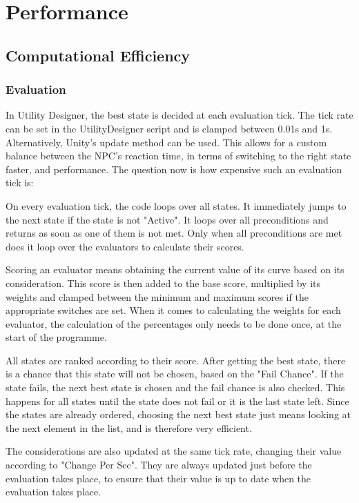 \chapter{Performance}
\label{chap:performance}
\section{Computational Efficiency}
\label{sec:performance_computationalefficiency}

\subsection{Evaluation}
\label{sec:performance_computationalefficiency_evaluation}

In Utility Designer, the best state is decided at each evaluation tick. The tick rate can be set in the UtilityDesigner script and is clamped between 0.01s and 1s. Alternatively, Unity's update method can be used. This allows for a custom balance between the NPC's reaction time, in terms of switching to the right state faster, and performance. The question now is how expensive such an evaluation tick is:

On every evaluation tick, the code loops over all states. It immediately jumps to the next state if the state is not "Active". It loops over all preconditions and returns as soon as one of them is not met. Only when all preconditions are met does it loop over the evaluators to calculate their scores.

Scoring an evaluator means obtaining the current value of its curve based on its consideration. This score is then added to the base score, multiplied by its weights and clamped between the minimum and maximum scores if the appropriate switches are set. When it comes to calculating the weights for each evaluator, the calculation of the percentages only needs to be done once, at the start of the programme.

All states are ranked according to their score. After getting the best state, there is a chance that this state will not be chosen, based on the "Fail Chance". If the state fails, the next best state is chosen and the fail chance is also checked. This happens for all states until the state does not fail or it is the last state left. Since the states are already ordered, choosing the next best state just means looking at the next element in the list, and is therefore very efficient.

The considerations are also updated at the same tick rate, changing their value according to "Change Per Sec". They are always updated just before the evaluation takes place, to ensure that their value is up to date when the evaluation takes place.

